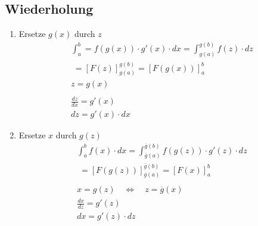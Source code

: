\subsection{Wiederholung}
\begin{enumerate}
  \item Ersetze $g(x)$ durch $z$
  \begin{gather*}
    \int_a^b = f(g(x)) \cdot g'(x) \cdot dx = \int_{g(a)}^{g(b)} f(z) \cdot dz \\
    \;= \left[F(z)\right]_{g(a)}^{g(b)} = \left[F(g(x))\right]_a^b \\
    z = g(x) \\\\
    \frac{dz}{dx} = g'(x) \\
    dz = g'(x) \cdot dx
  \end{gather*}
  \item Ersetze $x$ durch $g(z)$
  \begin{gather*}
    \int_a^b f(x) \cdot dx = \int_{\overline{g}(a)}^{\overline{g}(b)} f(g(z)) \cdot g'(z) \cdot dz \\
    \;= \left[F(g(z))\right]_{\overline{g}(a)}^{\overline{g}(b)} = \left[F(x)\right]_a^b \\\\
    x = g(z) \quad\Leftrightarrow\quad z = \overline{g}(x) \\
    \frac{dx}{dz} = g'(z) \\
    dx = g'(z) \cdot dz
  \end{gather*}
\end{enumerate}
